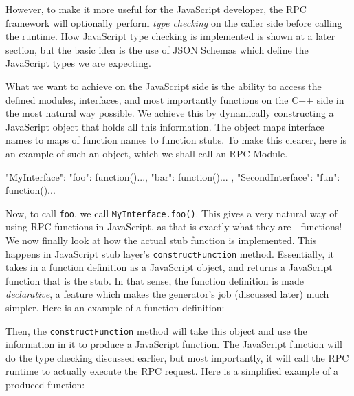 However, to make it more useful for the JavaScript developer, the RPC framework will optionally perform \emph{type checking} on the caller side before calling the runtime. How JavaScript type checking is implemented is shown at a later section, but the basic idea is the use of JSON Schemas which define the JavaScript types we are expecting.

What we want to achieve on the JavaScript side is the ability to access the defined modules, interfaces, and most importantly functions on the C++ side in the most natural way possible. We achieve this by dynamically constructing a JavaScript object that holds all this information. The object maps interface names to maps of function names to function stubs. To make this clearer, here is an example of such an object, which we shall call an RPC Module.

\begin{code}
{
  "MyInterface": {
    "foo": function(){...},
    "bar": function(){...}
  },
  "SecondInterface": {
    "fun": function(){...}
  }
}
\end{code}

Now, to call \lstinline{foo}, we call \lstinline{MyInterface.foo()}. This gives a very natural way of using RPC functions in JavaScript, as that is exactly what they are - functions! We now finally look at how the actual stub function is implemented. This happens in JavaScript stub layer's \lstinline{constructFunction} method. Essentially, it takes in a function definition as a JavaScript object, and returns a JavaScript function that is the stub. In that sense, the function definition is made \emph{declarative}, a feature which makes the generator's job (discussed later) much simpler. Here is an example of a function definition:


Then, the \lstinline{constructFunction} method will take this object and use the information in it to produce a JavaScript function. The JavaScript function will do the type checking discussed earlier, but most importantly, it will call the RPC runtime to actually execute the RPC request. Here is a simplified example of a produced function:

